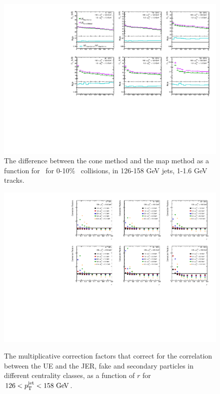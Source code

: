 \begin{figure}
\centerline{\includegraphics[page=2,width=1.\textwidth]{figures_UE/UE_x_ratio_c0}}
    \caption{The difference between the cone method and the map method as a function for \rvar\ for 0-10\% \pbpb\ collisions, in 126-158 GeV jets, 1-1.6 GeV tracks.}
    \label{fig:conemethod_mapmethod}
\end{figure}




\begin{figure}[ht]
\centerline{
\includegraphics[page=1,width=1.\textwidth]{figures_UE/UE_factors_r.pdf} \\
}
\caption{
The multiplicative correction factors that correct for the correlation between the UE and the JER, fake and secondary particles in different centrality classes, as a function of $r$ for $126 < \ptjet < 158 \GeV$.}
\label{fig:UEweights_r_jet0}
\end{figure}


